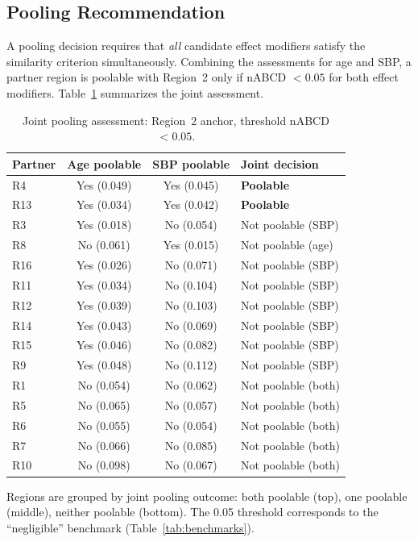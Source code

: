 \subsection{Pooling Recommendation}\label{sec:app_pooling}

A pooling decision requires that \emph{all} candidate effect modifiers satisfy the similarity criterion simultaneously. Combining the assessments for age and SBP, a partner region is poolable with Region~2 only if nABCD $< 0.05$ for both effect modifiers. Table~\ref{tab:gusto_pooling} summarizes the joint assessment.

\begin{table}[ht]
\caption{Joint pooling assessment: Region~2 anchor, threshold nABCD $< 0.05$.\label{tab:gusto_pooling}}
\begin{tabular*}{\textwidth}{@{\extracolsep\fill}lccl@{}}
\toprule
\textbf{Partner} & \textbf{Age poolable} & \textbf{SBP poolable} & \textbf{Joint decision} \\
\midrule
R4  & Yes (0.049) & Yes (0.045) & \textbf{Poolable} \\
R13 & Yes (0.034) & Yes (0.042) & \textbf{Poolable} \\
\addlinespace
R3  & Yes (0.018) & No (0.054) & Not poolable (SBP) \\
R8  & No (0.061) & Yes (0.015) & Not poolable (age) \\
R16 & Yes (0.026) & No (0.071) & Not poolable (SBP) \\
R11 & Yes (0.034) & No (0.104) & Not poolable (SBP) \\
R12 & Yes (0.039) & No (0.103) & Not poolable (SBP) \\
R14 & Yes (0.043) & No (0.069) & Not poolable (SBP) \\
R15 & Yes (0.046) & No (0.082) & Not poolable (SBP) \\
R9  & Yes (0.048) & No (0.112) & Not poolable (SBP) \\
\addlinespace
R1  & No (0.054) & No (0.062) & Not poolable (both) \\
R5  & No (0.065) & No (0.057) & Not poolable (both) \\
R6  & No (0.055) & No (0.054) & Not poolable (both) \\
R7  & No (0.066) & No (0.085) & Not poolable (both) \\
R10 & No (0.098) & No (0.067) & Not poolable (both) \\
\bottomrule
\end{tabular*}
\begin{tablenotes}
\item Regions are grouped by joint pooling outcome: both poolable (top), one poolable (middle), neither poolable (bottom). The 0.05 threshold corresponds to the ``negligible'' benchmark (Table~\ref{tab:benchmarks}).
\end{tablenotes}
\end{table}

